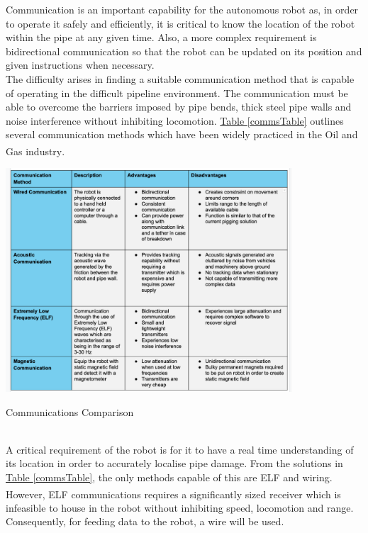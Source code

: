 \documentclass[11pt]{article}		%
\newcommand{\supercite}[1]{\textsuperscript{\cite{#1}}}		%
\newcommand{\tableref}[1]{\hyperref[#1]{Table \ref*{#1}}}     %
\begin{document}
			Communication is an important capability for the autonomous robot as, in order to operate it safely and efficiently, it is critical to know the location of the robot within the pipe at any given time. 
			Also, a more complex requirement is bidirectional communication so that the robot can be updated on its position and given instructions when necessary. 
			\\
            \hspace*{3ex}The difficulty arises in finding a suitable communication method that is capable of operating in the difficult pipeline environment. 
		    The communication must be able to overcome the barriers imposed by pipe bends, thick steel pipe walls and noise interference without inhibiting locomotion.
		    \tableref{commsTable} outlines several communication methods which have been widely practiced in the Oil and Gas industry\supercite{acoustic2020}.
	        \begin{table}[h]
				\centering
				\includegraphics[width=0.8\textwidth]{commscomparison}
				\caption{Communications Comparison}
				\label{commsTable}
			\end{table}
			\\
            \hspace*{3ex}A critical requirement of the robot is for it to have a real time understanding of its location in order to accurately localise pipe damage. 
	     	From the solutions in \tableref{commsTable}, the only methods capable of this are ELF and wiring. 
	     	However, ELF communications requires a significantly sized receiver\supercite{elfreceiversize} which is infeasible to house in the robot without inhibiting speed, locomotion and range. 
	     	Consequently, for feeding data to the robot, a wire will be used.
	        \\ 
\end{document}
